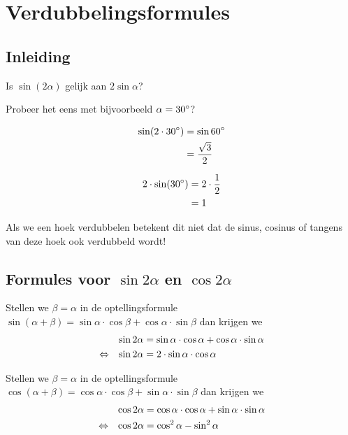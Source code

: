 \documentclass[twoside,a4paper,12pt]{article}
\begin{document}
\cleardoublepage
\section{Verdubbelingsformules}

\subsection{Inleiding}
Is $\sin(2\alpha)$ gelijk aan $2\sin\alpha$?

Probeer het eens met bijvoorbeeld $\alpha=30^\circ$?

\begin{minipage}{0.3\textwidth}
\begin{align*}
  \sin(2\cdot30^\circ) &= \sin 60^\circ\\
                        &= \dfrac{\sqrt{3}}{2}
\end{align*}
\end{minipage}
\begin{minipage}{0.3\textwidth}
\begin{align*}
  2\cdot\sin(30^\circ) &= 2\cdot\dfrac{1}{2}\\
                        &= 1
\end{align*}
\end{minipage}

Als we een hoek verdubbelen betekent dit niet dat de sinus, cosinus of tangens van deze hoek ook verdubbeld wordt!

\subsection{Formules voor $\sin 2\alpha$ en $\cos 2\alpha$}


Stellen we $\beta=\alpha$ in de optellingsformule $\sin(\alpha+\beta)=\sin\alpha\cdot\cos\beta + \cos\alpha\cdot\sin\beta$ dan krijgen we
\begin{align*}
       && \sin 2\alpha &= \sin\alpha\cdot\cos\alpha+\cos\alpha\cdot\sin\alpha\\
  \Leftrightarrow && \sin 2\alpha &= 2\cdot\sin\alpha\cdot\cos\alpha
\end{align*}

Stellen we $\beta=\alpha$ in de optellingsformule $\cos(\alpha+\beta)=\cos\alpha\cdot\cos\beta + \sin\alpha\cdot\sin\beta$ dan krijgen we
\begin{align*}
       && \cos 2\alpha &= \cos\alpha\cdot\cos\alpha+\sin\alpha\cdot\sin\alpha\\
  \Leftrightarrow && \cos 2\alpha &= \cos^2\alpha -\sin^2\alpha
\end{align*}
\end{document}
